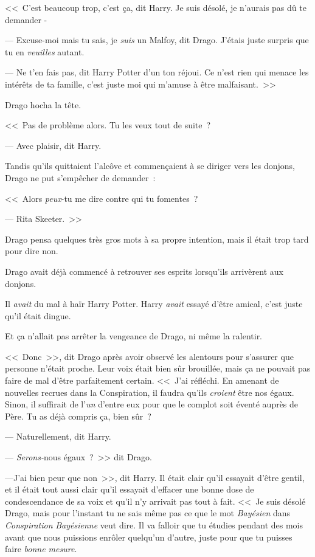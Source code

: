 <<~C'est beaucoup trop, c'est ça, dit Harry. Je suis désolé, je n'aurais pas dû te demander -

--- Excuse-moi mais tu sais, je \emph{suis} un Malfoy, dit Drago. J'étais juste surpris que tu en \emph{veuilles} autant.

--- Ne t'en fais pas, dit Harry Potter d'un ton réjoui. Ce n'est rien qui menace les intérêts de ta famille, c'est juste moi qui m'amuse à être malfaisant.~>>

Drago hocha la tête.

<<~Pas de problème alors. Tu les veux tout de suite~?

--- Avec plaisir, dit Harry.

Tandis qu'ils quittaient l'alcôve et commençaient à se diriger vers les donjons, Drago ne put s'empêcher de demander~:

<<~Alors \emph{peux}-tu me dire contre qui tu fomentes~?

--- Rita Skeeter.~>>

Drago pensa quelques très gros mots à sa propre intention, mais il était trop tard pour dire non.

\later

Drago avait déjà commencé à retrouver ses esprits lorsqu'ils arrivèrent aux donjons.

Il \emph{avait} du mal à haïr Harry Potter. Harry \emph{avait} essayé d'être amical, c'est juste qu'il était dingue.

Et ça n'allait pas arrêter la vengeance de Drago, ni même la ralentir.

<<~Donc~>>, dit Drago après avoir observé les alentours pour s'assurer que personne n'était proche. Leur voix était bien sûr brouillée, mais ça ne pouvait pas faire de mal d'être parfaitement certain. <<~J'ai réfléchi. En amenant de nouvelles recrues dans la Conspiration, il faudra qu'ils \emph{croient} être nos égaux. Sinon, il suffirait de l'\emph{un} d'entre eux pour que le complot soit éventé auprès de Père. Tu as déjà compris ça, bien sûr~?

--- Naturellement, dit Harry.

--- \emph{Serons-}nous égaux~?~>> dit Drago.

---J'ai bien peur que non~>>, dit Harry. Il était clair qu'il essayait d'être gentil, et il était tout aussi clair qu'il essayait d'effacer une bonne dose de condescendance de sa voix et qu'il n'y arrivait pas tout à fait. <<~Je suis désolé Drago, mais pour l'instant tu ne sais même pas ce que le mot \emph{Bayésien} dans \emph{Conspiration} \emph{Bayésienne} veut dire. Il va falloir que tu étudies pendant des mois avant que nous puissions enrôler quelqu'un d'autre, juste pour que tu puisses faire \emph{bonne mesure}.

